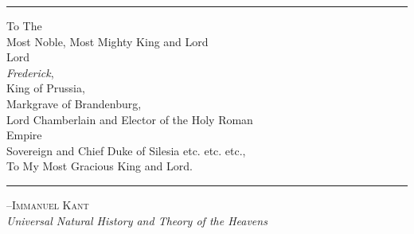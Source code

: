 
\mbox{}
\hrule

\vspace{1in}


\begin{centering}
	\large{To The} \\
	\Large{Most Noble, Most Mighty King and Lord \\ 
				 Lord
				 } \\
	\huge{\textit{Frederick},} \\
	\Large{King of Prussia, \\ 
				 Markgrave of Brandenburg, \\
	       Lord Chamberlain and Elector of the Holy Roman \\ 
				 Empire \\
	       Sovereign and Chief Duke of Silesia etc. etc. etc., \\
				 To My Most Gracious King and Lord.\\
				 }
\end{centering}
\vspace{1in}
\hrule

\begin{flushright}
	{\scshape {--Immanuel Kant}}\\
	{\textit{Universal Natural History and Theory of the Heavens}}
\end{flushright}
	
\vfill


















\textwidth 5.750in \textheight=8.50in \headheight 0.0625in \topmargin 0.0in %

